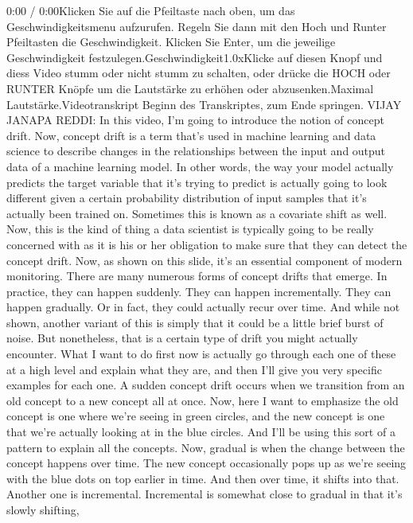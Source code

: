 {{{{{{{{    0:00 / 0:00Klicken Sie auf die Pfeiltaste nach oben, um das Geschwindigkeitsmenu aufzurufen. Regeln Sie dann mit den Hoch und Runter Pfeiltasten die Geschwindigkeit. Klicken Sie Enter, um die jeweilige Geschwindigkeit festzulegen.Geschwindigkeit1.0xKlicke auf diesen Knopf und diess Video stumm oder nicht stumm zu schalten, oder drücke die HOCH oder RUNTER Knöpfe um die Lautstärke zu erhöhen oder abzusenken.Maximal Lautstärke.Videotranskript
    Beginn des Transkriptes, zum Ende springen.
    VIJAY JANAPA REDDI: In this video, I'm going
    to introduce the notion of concept drift.
    Now, concept drift is a term that's used in machine learning and data science
    to describe changes in the relationships between the input and output
    data of a machine learning model.
    In other words, the way your model actually predicts the target variable
    that it's trying to predict is actually going
    to look different given a certain probability
    distribution of input samples that it's actually been trained on.
    Sometimes this is known as a covariate shift as well.
    Now, this is the kind of thing a data scientist is typically
    going to be really concerned with as it is his or her obligation to make sure
    that they can detect the concept drift.
    Now, as shown on this slide, it's an essential component
    of modern monitoring.
    There are many numerous forms of concept drifts that emerge.
    In practice, they can happen suddenly.
    They can happen incrementally.
    They can happen gradually.
    Or in fact, they could actually recur over time.
    And while not shown, another variant of this
    is simply that it could be a little brief burst of noise.
    But nonetheless, that is a certain type of drift you might actually encounter.
    What I want to do first now is actually go
    through each one of these at a high level and explain what they are,
    and then I'll give you very specific examples for each one.
    A sudden concept drift occurs when we transition from an old concept
    to a new concept all at once.
    Now, here I want to emphasize the old concept is
    one where we're seeing in green circles, and the new concept
    is one that we're actually looking at in the blue circles.
    And I'll be using this sort of a pattern to explain all the concepts.
    Now, gradual is when the change between the concept happens over time.
    The new concept occasionally pops up as we're
    seeing with the blue dots on top earlier in time.
    And then over time, it shifts into that.
    Another one is incremental.
    Incremental is somewhat close to gradual in that it's slowly shifting,
}}}}}}}}
